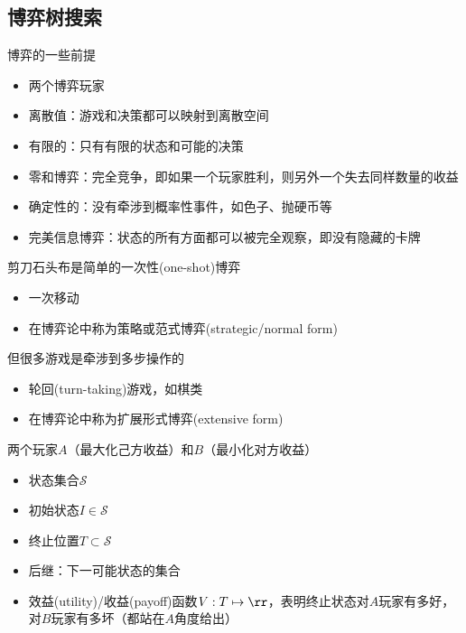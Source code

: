 
\subsection{博弈树搜索}
博弈的一些前提
\begin{itemize}
	\item 两个博弈玩家
	\item 离散值：游戏和决策都可以映射到离散空间
	\item 有限的：只有有限的状态和可能的决策
	\item 零和博弈：完全竞争，即如果一个玩家胜利，则另外一个失去同样数量的收益
	\item 确定性的：没有牵涉到概率性事件，如色子、抛硬币等
	\item 完美信息博弈：状态的所有方面都可以被完全观察，即没有隐藏的卡牌
\end{itemize}

剪刀石头布是简单的一次性(one-shot)博弈
\begin{itemize}
	\item 一次移动
	\item 在博弈论中称为策略或范式博弈(strategic/normal form)
\end{itemize}

但很多游戏是牵涉到多步操作的
\begin{itemize}
	\item 轮回(turn-taking)游戏，如棋类
	\item 在博弈论中称为扩展形式博弈(extensive form)
\end{itemize}

两个玩家$A$（最大化己方收益）和$B$（最小化对方收益）
\begin{itemize}
	\item 状态集合$\mathcal{S}$
	\item 初始状态$I\in\mathcal{S}$
	\item 终止位置$T\subset\mathcal{S}$
	\item 后继：下一可能状态的集合
	\item 效益(utility)/收益(payoff)函数$V:T\mapsto\rr$，表明终止状态对$A$玩家有多好，对$B$玩家有多坏（都站在$A$角度给出）
\end{itemize}

